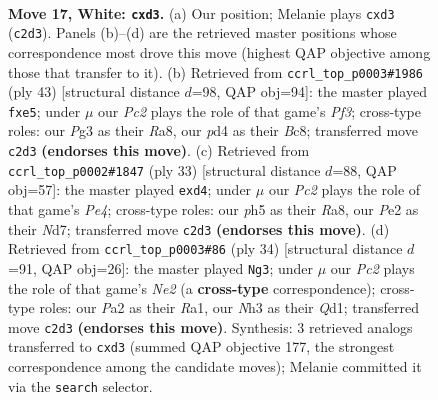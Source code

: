 \documentclass[11pt]{article}
\begin{document}
\clearpage

\begin{figure}[p]\centering
\begin{subfigure}{0.46\textwidth}\centering
\resizebox{\linewidth}{!}{%
\newchessgame
\chessboard[
  setfen={rn1q1rk1/4bp2/5np1/p1p4p/1p1p3P/1P1p2PN/P1P1PPK1/RNB1QR2 w - - 0 17},
  showmover=false,
  pgfstyle=straightmove, color=movearrow, markmove={c2-d3}
]}
\caption{}
\end{subfigure}\hfill
\begin{subfigure}{0.46\textwidth}\centering
\resizebox{\linewidth}{!}{%
\newchessgame
\chessboard[
  setfen={r1bq1rk1/5nbp/pp3pp1/1Pp1P3/P1PpP3/3P1NP1/6BP/1RBQ1RK1 b - - 0 22},
  showmover=false,
  pgfstyle=straightmove, color=movearrow, markmove={f6-e5}
]}
\caption{}
\end{subfigure}
\\[4pt]
\begin{subfigure}{0.46\textwidth}\centering
\resizebox{\linewidth}{!}{%
\newchessgame
\chessboard[
  setfen={r3k2r/1pqnbpp1/p1p4p/2P1p3/PP1Pp3/4P2P/1N1B1PP1/R2Q1RK1 b kq - 1 17},
  showmover=false,
  pgfstyle=straightmove, color=movearrow, markmove={e5-d4}
]}
\caption{}
\end{subfigure}\hfill
\begin{subfigure}{0.46\textwidth}\centering
\resizebox{\linewidth}{!}{%
\newchessgame
\chessboard[
  setfen={r2q1rk1/4b1pp/3ppn2/p1p5/Pp1pP3/3P3P/1PPBNPP1/R2Q1RK1 w - - 0 18},
  showmover=false,
  pgfstyle=straightmove, color=movearrow, markmove={e2-g3}
]}
\caption{}
\end{subfigure}
\caption{\textbf{Move 17, White: \texttt{cxd3}.} (a) Our position; Melanie plays \texttt{cxd3} (\texttt{c2d3}). Panels (b)--(d) are the retrieved master positions whose correspondence most drove this move (highest QAP objective among those that transfer to it). (b) Retrieved from \texttt{ccrl\_top\_p0003\#1986} (ply 43) [structural distance $d$=98, QAP obj=94]: the master played \texttt{fxe5}; under $\mu$ our \emph{Pc2} plays the role of that game's \emph{Pf3}; cross-type roles: our \emph{P}g3 as their \emph{R}a8, our \emph{p}d4 as their \emph{B}c8; transferred move \texttt{c2d3} \textbf{(endorses this move)}. (c) Retrieved from \texttt{ccrl\_top\_p0002\#1847} (ply 33) [structural distance $d$=88, QAP obj=57]: the master played \texttt{exd4}; under $\mu$ our \emph{Pc2} plays the role of that game's \emph{Pe4}; cross-type roles: our \emph{p}h5 as their \emph{R}a8, our \emph{P}e2 as their \emph{N}d7; transferred move \texttt{c2d3} \textbf{(endorses this move)}. (d) Retrieved from \texttt{ccrl\_top\_p0003\#86} (ply 34) [structural distance $d$=91, QAP obj=26]: the master played \texttt{Ng3}; under $\mu$ our \emph{Pc2} plays the role of that game's \emph{Ne2} (a \textbf{cross-type} correspondence); cross-type roles: our \emph{P}a2 as their \emph{R}a1, our \emph{N}h3 as their \emph{Q}d1; transferred move \texttt{c2d3} \textbf{(endorses this move)}. Synthesis: 3 retrieved analogs transferred to \texttt{cxd3} (summed QAP objective 177, the strongest correspondence among the candidate moves); Melanie committed it via the \texttt{search} selector.}
\label{fig:thought-m32}
\end{figure}
\end{document}
